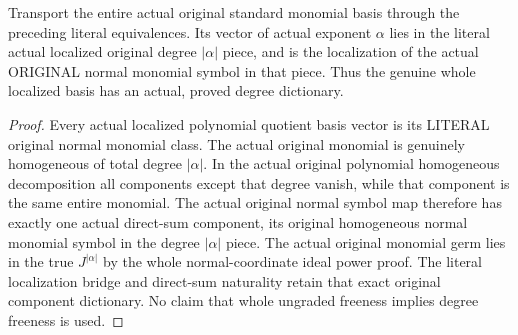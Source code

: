 \begin{theorem}
\label{hir:relative-normal-localgraded-actual-monomial-degree}
\leanok
{}
Transport the entire actual original standard monomial basis through the
preceding literal equivalences. Its vector of actual exponent $\alpha$ lies
in the literal actual localized original degree $|\alpha|$ piece, and is the
localization of the actual ORIGINAL normal monomial symbol in that piece.
Thus the genuine whole localized basis has an actual, proved degree dictionary.
\end{theorem}
\begin{proof}
Every actual localized polynomial quotient basis vector is its LITERAL
original normal monomial class. The actual original monomial is genuinely
homogeneous of total degree $|\alpha|$. In the actual original polynomial
homogeneous decomposition all components except that degree vanish, while
that component is the same entire monomial. The actual original normal
symbol map therefore has exactly one actual direct-sum component, its
original homogeneous normal monomial symbol in the degree $|\alpha|$ piece.
The actual original monomial germ lies in the true $J^{|\alpha|}$ by the
whole normal-coordinate ideal power proof. The literal localization bridge
and direct-sum naturality retain that exact original component dictionary.
No claim that whole ungraded freeness implies degree freeness is used.
\end{proof}

